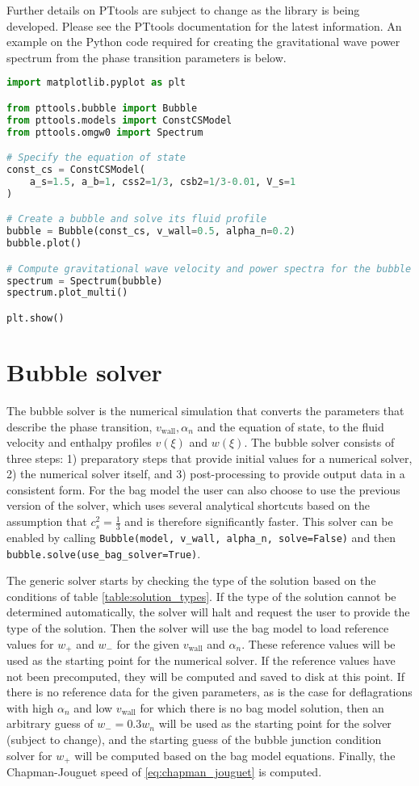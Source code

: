 Further details on PTtools are subject to change as the library is being developed.
Please see the PTtools documentation for the latest information.
An example on the Python code required for creating the gravitational wave power spectrum from the phase transition parameters is below.

\lstset{breaklines=true}
\begin{lstlisting}[language=Python]
import matplotlib.pyplot as plt

from pttools.bubble import Bubble
from pttools.models import ConstCSModel
from pttools.omgw0 import Spectrum

# Specify the equation of state
const_cs = ConstCSModel(
    a_s=1.5, a_b=1, css2=1/3, csb2=1/3-0.01, V_s=1
)

# Create a bubble and solve its fluid profile
bubble = Bubble(const_cs, v_wall=0.5, alpha_n=0.2)
bubble.plot()

# Compute gravitational wave velocity and power spectra for the bubble
spectrum = Spectrum(bubble)
spectrum.plot_multi()

plt.show()
\end{lstlisting}


\section{Bubble solver}
The bubble solver is the numerical simulation that converts the parameters that describe the phase transition, $v_{\text{wall}}, \alpha_n$ and the equation of state, to the fluid velocity and enthalpy profiles $v(\xi)$ and $w(\xi)$.
The bubble solver consists of three steps:
1) preparatory steps that provide initial values for a numerical solver,
2) the numerical solver itself, and
3) post-processing to provide output data in a consistent form.
For the bag model the user can also choose to use the previous version of the solver,
which uses several analytical shortcuts based on the assumption that $c_s^2 = \frac{1}{3}$ and is therefore significantly faster.
This solver can be enabled by calling \verb|Bubble(model, v_wall, alpha_n, solve=False)| and then \verb|bubble.solve(use_bag_solver=True)|.

The generic solver starts by checking the type of the solution based on the conditions of table \ref{table:solution_types}.
If the type of the solution cannot be determined automatically, the solver will halt and request the user to provide the type of the solution.
Then the solver will use the bag model to load reference values for $w_+$ and $w_-$ for the given $v_\text{wall}$ and $\alpha_n$.
These reference values will be used as the starting point for the numerical solver.
If the reference values have not been precomputed,
they will be computed and saved to disk at this point.
If there is no reference data for the given parameters,
as is the case for deflagrations with high $\alpha_n$ and low $v_\text{wall}$ for which there is no bag model solution,
then an arbitrary guess of $w_- = 0.3 w_n$ will be used as the starting point for the solver (subject to change),
and the starting guess of the bubble junction condition solver for $w_+$ will be computed based on the bag model equations.
Finally, the Chapman-Jouguet speed of \eqref{eq:chapman_jouguet} is computed.

